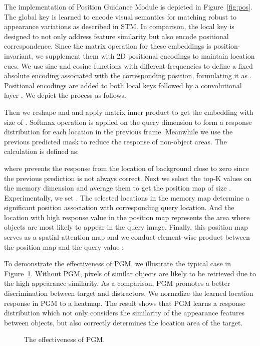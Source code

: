\documentclass[final]{cvpr}
\begin{document}
The implementation of Position Guidance Module is depicted in Figure~\ref{fig:pos}. The global key is learned to encode visual semantics for matching robust to appearance variations as described in STM. In comparison, the local key is designed to not only address feature similarity but also encode positional correspondence. Since the matrix operation for these embeddings is position-invariant, we supplement them with 2D positional encodings\cite{imagetrans,detr} to maintain location cues. We use sine and cosine functions with different frequencies to define a fixed absolute encoding associated with the corresponding position, formulating it as . Positional encodings are added to both local keys followed by a  convolutional layer . We depict the process as follows.



Then we reshape  and  and apply matrix inner product to get the embedding  with size of . Softmax operation is applied on the query dimension to form a response distribution for each location in the previous frame. Meanwhile we use the previous predicted mask to reduce the response of non-object areas. The calculation is defined as:

where  prevents the response from the location of background close to zero since the previous prediction is not always correct. Next we select the top-K values on the memory dimension and average them to get the position map of size . Experimentally, we set . The selected locations in the memory map determine a significant position association with corresponding query location. And the location with high response value in the position map represents the area where objects are most likely to appear in the query image. Finally, this position map serves as a spatial attention map and we conduct element-wise product between the position map and the query value :


To demonstrate the effectiveness of PGM, we illustrate the typical case in Figure~\ref{fig:posv}. Without PGM, pixels of similar objects are likely to be retrieved due to the high appearance similarity. As a comparison, PGM promotes a better discrimination between target and distractors.
We normalize the learned location response in PGM to a heatmap. The result shows that PGM learns a response distribution which not only considers the similarity of the appearance features between objects, but also correctly determines the location area of the target.




\begin{figure}[!t]
\begin{center}
	\setlength{\fboxrule}{0pt}
\end{center}
\vspace{-0.3cm}
\caption{The effectiveness of PGM.}
\label{fig:posv}
\end{figure}
\end{document}
